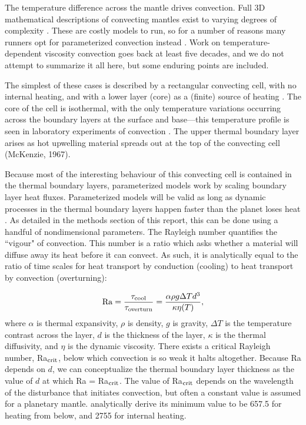 The temperature difference across the mantle drives convection. Full 3D mathematical descriptions of convecting mantles exist to varying degrees of complexity \citep[e.g.,][]{McKenzie1974, Schubert1992}. These are costly models to run, so for a number of reasons many runners opt for parameterized convection instead \citep{Sharpe1979, Schubert1980, Davies1980}. %
Work on temperature-dependent viscosity convection goes back at least five decades, and we do not attempt to summarize it all here, but some enduring points are included.

The simplest of these cases is described by a rectangular convecting cell, with no internal heating, and with a lower layer (core) as a (finite) source of heating \citep[e.g.,][]{McKenzie1981}. The core of the cell is isothermal, with the only temperature variations occurring across the boundary layers at the surface and base---this temperature profile is seen in laboratory experiments of convection \citep[e.g.,][]{Davaille1993}. The upper thermal boundary layer arises as hot upwelling material spreads out at the top of the convecting cell (McKenzie, 1967).

Because most of the interesting behaviour of this convecting cell is contained in the thermal boundary layers, parameterized models work by scaling boundary layer heat fluxes. Parameterized models will be valid as long as dynamic processes in the thermal boundary layers happen faster than the planet loses heat \citep{Sharpe1979, Korenaga2008a}. As detailed in the methods section of this report, this can be done using a handful of nondimensional parameters. The Rayleigh number quantifies the ``vigour" of convection. This number is a ratio which asks whether a material will diffuse away its heat before it can convect. As such, it is analytically equal to the ratio of time scales for heat transport by conduction (cooling) to heat transport by convection (overturning):

\begin{equation}\label{eq:Ra}
\mathrm{Ra} = \frac{\tau_{\rm cool}}{\tau_{\rm overturn}}= \frac{\alpha \rho g \Delta T d^3 }{ \kappa \eta(T)},
\end{equation}
where $\alpha$ is thermal expansivity, $\rho$ is density, $g$ is gravity, $\Delta T$ is the temperature contrast across the layer, $d$ is the thickness of the layer, $\kappa$ is the thermal diffusivity, and $\eta$ is the dynamic viscosity. There exists a critical Rayleigh number, Ra$_{\rm crit}$, below which convection is so weak it halts altogether. Because Ra depends on $d$, we can conceptualize the thermal boundary layer thickness as the value of $d$ at which Ra = Ra$_{\rm crit}$. The value of Ra$_{\rm crit}$ depends on the wavelength of the disturbance that initiates convection, but often a constant value is assumed for a planetary mantle. \citet{Turcotte2002} analytically derive its minimum value to be 657.5 for heating from below, and 2755 for internal heating. 

